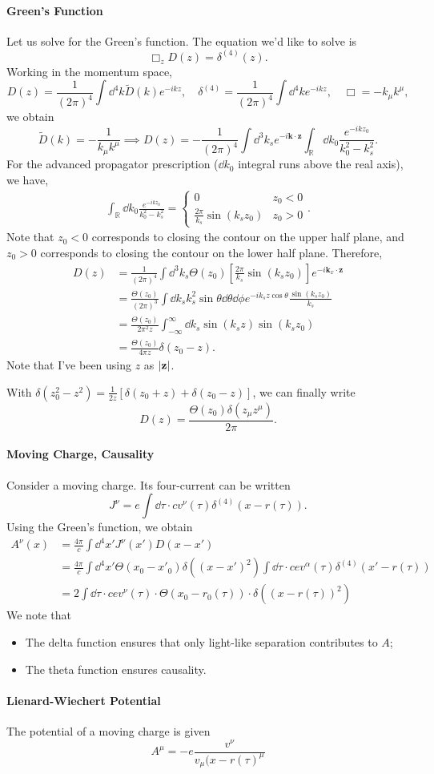 \documentclass{article}
\begin{document}
\paragraph{Green's Function}
Let us solve for the Green's function. The equation we'd like to solve is 
$$\Box_zD(z)=\delta^{(4)}(z).$$
Working in the momentum space,
$$D(z)=\frac 1{(2\pi)^4}\int\dd^4k\tilde D(k)e^{-ikz},\quad\delta^{(4)}=\frac 1{(2\pi)^4}\int\dd^4ke^{-ikz},\quad\Box=-k_\mu k^\mu,$$
we obtain 
$$\tilde D(k)=-\frac 1{k_\mu k^\mu}\implies D(z)=-\frac 1{(2\pi)^4}\int\dd^3k_se^{-i\mathbf k\cdot\mathbf z}\int_{\mathbb R}\dd k_0\frac{e^{-ikz_0}}{k^2_0-k^2_s}.$$
For the advanced propagator prescription ($\dd k_0$ integral runs above the real axis), we have, 
\begin{align*}
    \int_{\mathbb R}\dd k_0\frac{e^{-ikz_0}}{k_0^2-k_s^2}=\begin{cases}0&z_0<0\\\frac{2\pi}{k_s}\sin(k_sz_0)&z_0>0\end{cases}.
\end{align*}
Note that $z_0<0$ corresponds to closing the contour on the upper half plane, and $z_0>0$ corresponds to closing the contour on the lower half plane. Therefore, 
\begin{align*}
    D(z)&=\frac 1{(2\pi)^4}\int\dd^3k_s\Theta(z_0)\left[\frac{2\pi}{k_s}\sin(k_sz_0)\right]e^{-i\mathbf k_x\cdot\mathbf z}\\
    &=\frac{\Theta(z_0)}{(2\pi)^3}\int\dd k_sk_s^2\sin\theta\dd\theta\dd\phi e^{-ik_sz\cos\theta}\frac{\sin(k_sz_0)}{k_s}\\
    &=\frac{\Theta(z_0)}{2\pi^2z}\int^\infty_{-\infty}\dd k_s\sin(k_sz)\sin(k_sz_0)\\
    &=\frac{\Theta(z_0)}{4\pi z}\delta(z_0-z).
\end{align*}
Note that I've been using $z$ as $\left\lvert\mathbf z\right\rvert$.

With $\delta(z_0^2-z^2)=\frac 1{2z}[\delta(z_0+z)+\delta(z_0-z)]$, we can finally write
$$D(z)=\frac{\Theta(z_0)\delta(z_\mu z^\mu)}{2\pi}.$$

\paragraph{Moving Charge, Causality}
Consider a moving charge. Its four-current can be written 
$$J^\nu=e\int\dd\tau\cdot cv^\nu(\tau)\delta^{(4)}(x-r(\tau)).$$
Using the Green's function, we obtain
\begin{align*}
    A^\nu(x)&=\frac{4\pi}c\int\dd^4x'J^\nu(x')D(x-x')\\
    &=\frac{4\pi}c\int\dd^4x'\Theta(x_0-x'_0)\delta((x-x')^2)\int\dd\tau\cdot cev^\alpha(\tau)\delta^{(4)}(x'-r(\tau))\\
    &=2\int\dd\tau\cdot cev^\nu(\tau)\cdot\Theta(x_0-r_0(\tau))\cdot\delta((x-r(\tau))^2)
\end{align*}
We note that 
\begin{itemize}
    \item The delta function ensures that only light-like separation contributes to $A$;
    \item The theta function ensures causality.
\end{itemize}

\paragraph{Lienard-Wiechert Potential}
The potential of a moving charge is given 
$$A^\mu=-e\frac{v^\nu}{v_\mu(x-r(\tau)^\mu}$$
\end{document}
